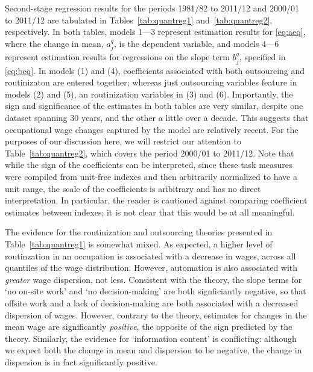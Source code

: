 Second-stage regression results for the periods 1981/82 to 2011/12 and 2000/01 to 2011/12 are tabulated in Tables~\ref{tab:quantreg1} and~\ref{tab:quantreg2}, respectively. In both tables, models 1---3 represent estimation results for \eqref{eq:aeq}, where the change in mean, $a_j^q$, is the dependent variable, and models 4---6 represent estimation results for regressions on the slope term $b_j^q$, specified in \eqref{eq:beq}. In models (1) and (4), coefficients associated with both outsourcing and routinizaton are entered together; whereas just outsourcing variables feature in models (2) and (5), an routinization variables in (3) and (6). Importantly, the sign and significance of the estimates in both tables are very similar, despite one dataset spanning 30 years, and the other a little over a decade. This suggests that occupational wage changes captured by the model are relatively recent. For the purposes of our discussion here, we will restrict our attention to Table~\ref{tab:quantreg2}, which covers the period 2000/01 to 2011/12. Note that while the sign of the coefficients can be interpreted, since these task measures were compiled from unit-free indexes and then arbitrarily normalized to have a unit range, the scale of the coefficients is aribitrary and has no direct interpretation. In particular, the reader is cautioned against comparing coefficient estimates between indexes; it is not clear that this would be at all meaningful.





The evidence for the routinization and outsourcing theories presented in Table~\ref{tab:quantreg1} is somewhat mixed. As expected, a higher level of routinzation in an occupation is associated with a decrease in wages, across all quantiles of the wage distribution. However, automation is also associated with {\em greater} wage dispersion, not less. Consistent with the theory, the slope terms for `no on-site work' and `no decision-making' are both signficiantly negative, so that offsite work and a lack of decision-making are both associated with a decreased dispersion of wages. However, contrary to the theory, estimates for changes in the mean wage are significantly {\em positive}, the opposite of the sign predicted by the theory. Similarly, the evidence for `information content' is conflicting: although we expect both the change in mean and dispersion to be negative, the change in dispersion is in fact significantly positive.

